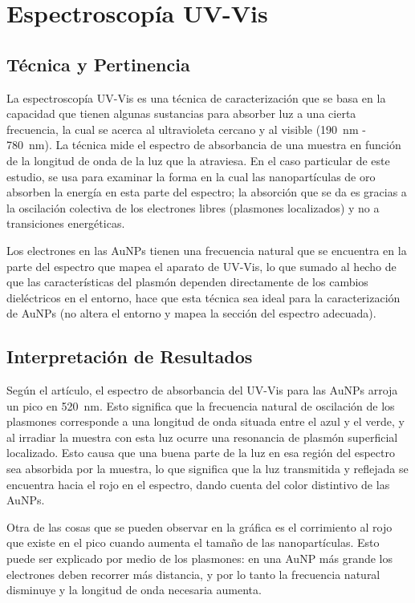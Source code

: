 \section{Espectroscopía UV-Vis}

\subsection{Técnica y Pertinencia}

La espectroscopía UV-Vis es una técnica de caracterización que se basa en la
capacidad que tienen algunas sustancias para absorber luz a una cierta
frecuencia, la cual se acerca al ultravioleta cercano y al visible
(\qty{190}{\nano\metre} - \qty{780}{\nano\metre}). La técnica mide el espectro
de absorbancia de una muestra en función de la longitud de onda de la luz que la
atraviesa. En el caso particular de este estudio, se usa para examinar la forma
en la cual las nanopartículas de oro absorben la energía en esta parte del
espectro; la absorción que se da es gracias a la oscilación colectiva de los
electrones libres (plasmones localizados) y no a transiciones energéticas.

Los electrones en las AuNPs tienen una frecuencia natural que se encuentra en la
parte del espectro que mapea el aparato de UV-Vis, lo que sumado al hecho de que
las características del plasmón dependen directamente de los cambios
dieléctricos en el entorno, hace que esta técnica sea ideal para la
caracterización de AuNPs (no altera el entorno y mapea la sección del espectro
adecuada).

\subsection{Interpretación de Resultados}

Según el artículo, el espectro de absorbancia del UV-Vis para las AuNPs arroja
un pico en \qty{520}{\nano\metre}. Esto significa que la frecuencia natural de
oscilación de los plasmones corresponde a una longitud de onda situada entre el
azul y el verde, y al irradiar la muestra con esta luz ocurre una resonancia de
plasmón superficial localizado. Esto causa que una buena parte de la luz en esa
región del espectro sea absorbida por la muestra, lo que significa que la luz
transmitida y reflejada se encuentra hacia el rojo en el espectro, dando cuenta
del color distintivo de las AuNPs.

Otra de las cosas que se pueden observar en la gráfica es el corrimiento al rojo
que existe en el pico cuando aumenta el tamaño de las nanopartículas. Esto puede
ser explicado por medio de los plasmones: en una AuNP más grande los electrones
deben recorrer más distancia, y por lo tanto la frecuencia natural disminuye y
la longitud de onda necesaria aumenta.

